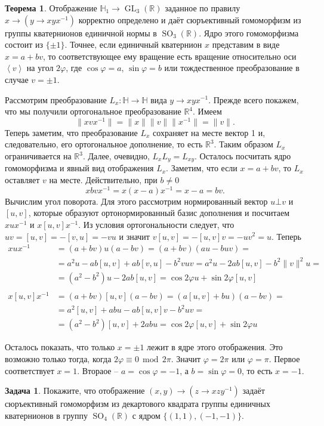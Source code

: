 \documentclass[10pt,a4paper,oneside]{book}
\theoremstyle{definition}
\newtheorem{zad}{\color{violet!100!black}Задача}
\newtheorem{thm}{\color{red!40!black}Теорема}
\renewcommand{\mod}{\,\operatorname{mod}\,}
\newcommand{\mb}[1]{\mathbb{#1}}
\newcommand{\GL}{\operatorname{GL}}
\newcommand{\SO}{\operatorname{SO}}
\def\ffi{\varphi}
\def\lan{\left\langle }
\def\ran{\right\rangle}
\def\thrm{\begin{thm}}
\def\ethrm{\end{thm}}
\def\zd{\begin{zad}}
\def\ezd{\end{zad}}
\begin{document}
\thrm Отображение $\mb H_{1}\to \GL_3(\mb R)$ заданное по правилу $x\to (y \to xyx^{-1})$ корректно определено и даёт сюръективный  гомоморфизм из группы кватернионов единичной нормы в $\SO_3(\mb R)$. Ядро этого гомоморфизма состоит из $\{\pm 1\}$. Точнее, если единичный кватернион $x$  представим в виде $x=a+bv$, то соответствующее ему вращение есть вращение относительно  оси $\lan v \ran$ на угол $2\ffi$, где $\cos \ffi= a$, $\sin \ffi= b$ или тождественное преобразование в случае $v=\pm 1$.
\ethrm
\proof Рассмотрим преобразование $L_x \colon \mb H \to \mb H$ вида $y \to xyx^{-1}$. Прежде всего покажем, что мы получили ортогональное преобразование $\mb R^4$. Имеем
 $$\|xvx^{-1}\|=\|x\| \|v\| \|x^{-1}\| = \|v\|.$$
Теперь заметим, что преобразование $L_x$ сохраняет на месте вектор 1 и, следовательно, его ортогональное дополнение, то есть $\mb R^3$. Таким образом $L_x$ ограничивается на $\mb R^3$. Далее, очевидно, $L_xL_y= L_{xy}$. Осталось посчитать ядро гомоморфизма и явный вид отображения $L_x$. Заметим, что если $x=a+bv$, то $L_x$ оставляет $v$ на месте. Действительно, при $b\neq 0$ 
$$xbvx^{-1}=x(x-a)x^{-1}= x-a=bv.$$
Вычислим угол поворота. Для этого рассмотрим нормированный вектор  $u\bot v$ и $[u,v]$, которые образуют ортонормированный базис дополнения и посчитаем $xux^{-1}$ и $x[u,v]x^{-1}$. Из условия ортогональности следует, что $uv=[u,v]=-[v,u]=-vu$ и значит $v[u,v]=-[u,v]v=-uv^2=u$. Теперь
\begin{align*}
xux^{-1}&=(a+bv)u(a-bv)= (a+bv)(au-buv)=\\
&=a^2u -ab[u,v]+ab[v,u]- b^2vuv=a^2u-2ab[u,v]-b^2\|v\|^2u=\\ &=(a^2-b^2)u-2ab[u,v]=\cos2\ffi u+ \sin 2\ffi [u,v]
\\
\\
x[u,v]x^{-1}&=(a+bv)[u,v](a-bv)= (a[u,v]+bu)(a-bv)=\\
&=a^2[u,v]+abu-ab[u,v]v-b^2uv=\\
&=(a^2-b^2)[u,v]+2abu=\cos 2\ffi[u,v]+\sin 2\ffi u
\end{align*}

Осталось показать, что только $x=\pm 1$ лежит в ядре этого отображения. Это возможно только тогда, когда $2\ffi \equiv 0 \mod 2\pi$. Значит $\ffi=2 \pi$ или $\ffi= \pi$. Первое соответствует $x=1$. Втораое --  $a=\cos \ffi = -1$, а $b=\sin \ffi = 0$, то есть $x=-1$. 
\endproof


\zd
Покажите, что отображение $(x,y) \to (z \to xzy^{-1})$ задаёт сюръективный гомоморфизм из декартового квадрата группы единичных кватернионов в группу $\SO_4(\mb R)$ с ядром $\{(1,1),(-1,-1)\}$.
\ezd
\end{document}
